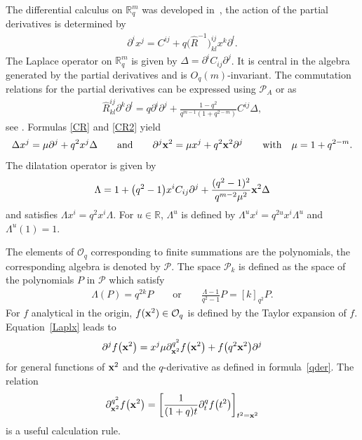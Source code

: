 \documentclass[11pt]{article}
\newcommand{\mR}{\mathbb{R}}
\newcommand{\cP}{\mathcal{P}}
\newcommand{\cO}{\mathcal{O}}
\numberwithin{equation}{section}
\begin{document}
The dif\/ferential calculus on $\mR^m_q$ was developed in~\cite{MR1138053, MR1182031}, the action of the partial derivatives is determined by
\begin{gather}
\label{defpart}
\partial^ix^j = C^{ij}+q\big(\hat{R}^{-1}\big)^{ij}_{kl}x^k\partial^l .
\end{gather}
The Laplace operator on $\mR^m_q$ is given by $\Delta=\partial^iC_{ij} \partial^j$. It is central in the algebra generated by the partial derivatives and is $O_q(m)$-invariant. The commutation relations for the partial derivatives can be expressed using $\cP_A$ or as
\begin{gather}
\label{Rxx}
\hat{R}^{ij}_{kl}\partial^k\partial^l = q\partial^i\partial^j+\frac{1-q^2}{q^{m-1}(1+q^{2-m})} C^{ij}\Delta,
\end{gather}
see \cite{MR1182031}. Formulas \eqref{CR} and \eqref{CR2} yield
\begin{gather}
\label{Laplx}
\Delta x^j=\mu\partial^j+q^2x^j\Delta \qquad \mbox{and} \qquad \partial^j\bold{x}^2=\mu x^j+q^2\bold{x}^2\partial^j\qquad  \mbox{with} \quad\mu=1+q^{2-m}.
\end{gather}
The dilatation operator is given by
\begin{gather}
\label{dil}
\Lambda=1+\big(q^2-1\big)x^iC_{ij}\partial^j+\frac{(q^2-1)^2}{q^{m-2}\mu^2}\bold{x}^2\Delta
\end{gather}
and satisf\/ies $\Lambda x^i=q^2x^i\Lambda $. For $u\in\mR$, $\Lambda^u$ is def\/ined by $\Lambda^u x^i=q^{2u}x^i\Lambda^u$ and $\Lambda^u(1)=1$.

The elements of $\cO_q$ corresponding to f\/inite summations are the polynomials, the correspon\-ding algebra is denoted by $\cP$. The space $\cP_k$ is def\/ined as the space of the polynomials $P$ in $\cP$ which satisfy
\begin{gather}
\label{propdil}
\Lambda (P)=q^{2k}P \qquad \mbox{or} \qquad \frac{\Lambda-1}{q^2-1}P=[k]_{q^2}P.
\end{gather}
For $f$ analytical in the origin, $f(\bold{x}^2)\in\cO_q$ is def\/ined by the Taylor expansion of $f$. Equa\-tion~\eqref{Laplx} leads to
\begin{gather}
\label{partialr}
\partial^jf\big(\bold{x}^2\big) = x^j\mu\partial_{\bold{x}^2}^{q^2}f\big(\bold{x}^2\big)+f\big(q^2\bold{x}^2\big)\partial^j
\end{gather}
for general functions of $\bold{x}^2$ and the $q$-derivative as def\/ined in formula~\eqref{qder}. The relation{\samepage
\begin{gather}
\label{berpx2}
\partial_{\bold{x}^2}^{q^2}f\big(\bold{x}^2\big) = \left[\frac{1}{(1+q)t}\partial_t^qf\big(t^2\big)\right]_{t^2=\bold{x}^2}
\end{gather}
is a useful calculation rule.}
\end{document}
